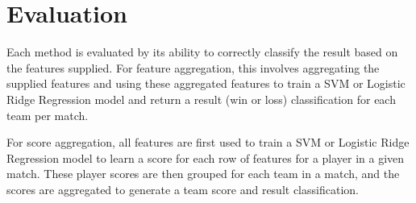 \documentclass[oribibl]{llncs}%
\begin{document}



\section{Evaluation} Each method is evaluated by its ability to correctly classify the result based on the features supplied. For feature aggregation, this involves aggregating the supplied features and using these aggregated features to train a SVM or Logistic Ridge Regression model and return a result (win or loss) classification for each team per match. 

For score aggregation, all features are first used to train a SVM or Logistic Ridge Regression model to learn a score for each row of features for a player in a given match. These player scores are then grouped for each team in a match, and the scores are aggregated to generate a team score and result classification.

%
%
\end{document}

